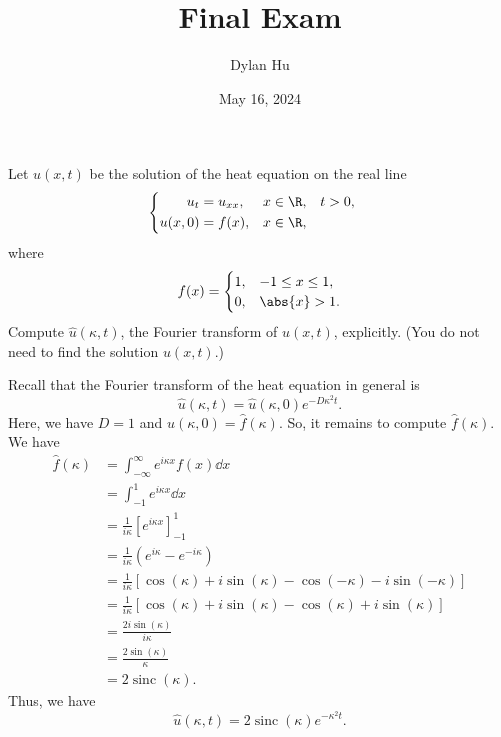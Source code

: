 \documentclass[plain]{pset}
\title{Final Exam}
\author{Dylan Hu}
\date{May 16, 2024}
\DeclareMathOperator{\sinc}{sinc}
\begin{document}
\maketitle

\pagebreak

\begin{problem}
Let \(u(x, t)\) be the solution of the heat equation on the real line
\[
    \begin{cases}
        \begin{aligned}
            u_t     & = u_{xx}, & x \in \R, &  & t > 0, \\
            u(x, 0) & = f(x),   & x \in \R,
        \end{aligned}
    \end{cases}
\]
where
\[
    f(x) = \begin{cases}
        1, & -1 \leq x \leq 1, \\
        0, & \abs{x} > 1.
    \end{cases}
\]
Compute \(\hat{u}(\kappa, t)\), the Fourier transform of \(u(x, t)\), explicitly. (You do not need to find the solution \(u(x, t)\).)
\end{problem}
\begin{solution}
    Recall that the Fourier transform of the heat equation in general is
    \[\hat{u}(\kappa, t) = \hat{u}(\kappa, 0) e^{-D\kappa^2 t}.\]
    Here, we have \(D = 1\) and \(\hat{u}(\kappa, 0) = \hat{f}(\kappa)\). So, it remains to compute \(\hat{f}(\kappa)\). We have
    \begin{align*}
        \hat{f}(\kappa) & =  \int_{-\infty}^\infty  e^{i\kappa x} f(x) \dd{x}                                               \\
                        & =  \int_{-1}^1 e^{i\kappa x} \dd{x}                                                               \\
                        & =  \frac{1}{i\kappa} \left[e^{i\kappa x} \right]_{-1}^1                                           \\
                        & =  \frac{1}{i\kappa} \left(e^{i\kappa} - e^{-i\kappa}\right)                                      \\
                        & =  \frac{1}{i\kappa} \left[ \cos(\kappa) + i\sin(\kappa) - \cos(-\kappa) - i\sin(-\kappa) \right] \\
                        & =  \frac{1}{i\kappa} \left[ \cos(\kappa) + i\sin(\kappa) - \cos(\kappa) + i\sin(\kappa) \right]   \\
                        & =  \frac{2i\sin(\kappa)}{i\kappa}                                                                 \\
                        & = \frac{2\sin(\kappa)}{\kappa}                                                                    \\
                        & =  2\sinc(\kappa).
    \end{align*}
    Thus, we have
    \[\hat{u}(\kappa, t) = 2\sinc(\kappa) e^{-\kappa^2 t}.\]
\end{solution}
\end{document}
